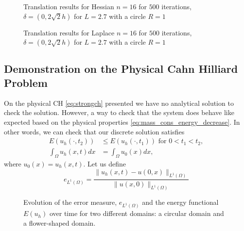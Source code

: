 \begin{figure}[hpbt!]
\centering

\subfloat[]{%

}

\subfloat[]{%

}


\caption{ Translation results for Hessian $n=16$ for $500$ iterations, $\delta =(0, 2 \sqrt{2}h) $ for $L=2.7$ with a circle $R=1$       }

\label{fig:trans_hes}
\end{figure}

\begin{figure}[hpbt!]
\centering

\subfloat[]{%

}

\subfloat[]{%

}


\caption{ Translation results for Laplace $n=16$ for $500$ iterations, $\delta =(0, 2 \sqrt{2}h) $ for $L=2.7$ with a circle $R=1$       }

\label{fig:trans_lap}
\end{figure}

\subsection{Demonstration on the Physical Cahn Hilliard Problem}%
\label{sub:demonstration_on_the_physical_cahn_hilliard}

On the physical CH \eqref{eq:strongch} presented we have no analytical solution to check the solution. However, a way to check that the system does behave like expected based on the physical properties \eqref{eq:mass_cons_energy_decrease}. In other
words, we can check that our discrete solution satisfies \[
    \begin{split}
 E( u_{h}( \cdot , t_{2}) ) & \le  E( u_{h}( \cdot , t_{1}) )   \text{ for } 0 < t_{1} < t_{2},  \\
\int_{\Omega }^{} u_{h} ( x,t)  dx & = \int_{\Omega }^{} u_{0}(x)  dx,
    \end{split}
\]
where $u_{0}( x) = u_{h}( x,t) $. Let us define
\[
 e_{L^{1}( \Omega)  } = \frac{\| u_h(x,t)- u(0,x)\|_{L^1(\Omega)}}{\|u(x,0)\|_{L^1(\Omega)}}
\]

\begin{figure}[h!]

\caption{Evolution of the error measure, $e_{L^{1}(\Omega)}$ and the energy functional $E(u_h)$ over time for two different domains: a circular domain and a flower-shaped domain.  }
\label{fig:physical_CH_plot}
\end{figure}

